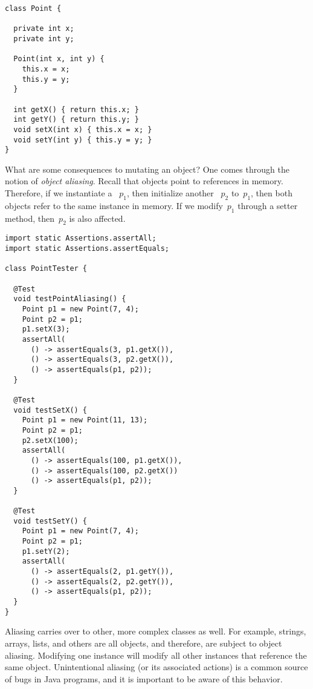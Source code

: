 \begin{lstlisting}[language=MyJava]
class Point {

  private int x;
  private int y;

  Point(int x, int y) { 
    this.x = x; 
    this.y = y; 
  }

  int getX() { return this.x; }
  int getY() { return this.y; }
  void setX(int x) { this.x = x; }
  void setY(int y) { this.y = y; }
}
\end{lstlisting}

What are some consequences to mutating an object? 
One comes through the notion of \emph{object aliasing}. 
Recall that objects point to references in memory. 
Therefore, if we instantiate a ~$p_1$, then initialize another ~$p_2$ to~$p_1$, then both objects refer to the same  instance in memory. 
If we modify~$p_1$ through a setter method, then~$p_2$ is also affected.

\enlargethispage{-3\baselineskip}
\begin{lstlisting}[language=MyJava]
import static Assertions.assertAll;
import static Assertions.assertEquals;

class PointTester {

  @Test
  void testPointAliasing() {
    Point p1 = new Point(7, 4);
    Point p2 = p1;
    p1.setX(3);
    assertAll(
      () -> assertEquals(3, p1.getX()),
      () -> assertEquals(3, p2.getX()),
      () -> assertEquals(p1, p2));
  }

  @Test
  void testSetX() {
    Point p1 = new Point(11, 13);
    Point p2 = p1;
    p2.setX(100);
    assertAll(
      () -> assertEquals(100, p1.getX()),
      () -> assertEquals(100, p2.getX())
      () -> assertEquals(p1, p2));
  }

  @Test
  void testSetY() {
    Point p1 = new Point(7, 4);
    Point p2 = p1;
    p1.setY(2);
    assertAll(
      () -> assertEquals(2, p1.getY()),
      () -> assertEquals(2, p2.getY()),
      () -> assertEquals(p1, p2));
  }
}
\end{lstlisting}

Aliasing carries over to other, more complex classes as well.
For example, strings, arrays, lists, and others are all objects, and therefore, are subject to object aliasing. 
Modifying one  instance will modify all other  instances that reference the same object. 
Unintentional aliasing (or its associated actions) is a common source of bugs in Java programs, and it is important to be aware of this behavior. 

